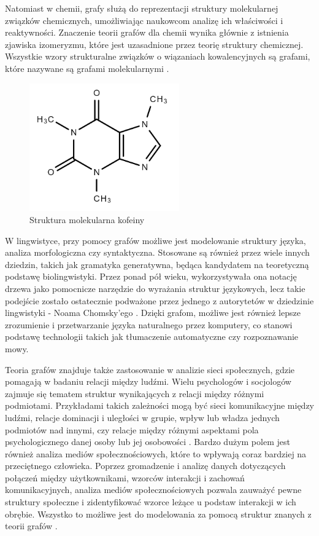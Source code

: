 Natomiast w chemii, grafy służą do reprezentacji struktury molekularnej związków chemicznych,
umożliwiając naukowcom analizę ich właściwości i reaktywności.
Znaczenie teorii grafów dla chemii wynika głównie z istnienia zjawiska izomeryzmu,
które jest uzasadnione przez teorię struktury chemicznej.
Wszystkie wzory strukturalne związków o wiązaniach kowalencyjnych są grafami,
które nazywane są grafami molekularnymi \cite{Balaban1985}.

\begin{figure}[ht]
	\centering
	\includegraphics[height=5.5cm]{partials/introduction/images/chem.png}
	\caption{Struktura molekularna kofeiny}
    \label{Fig:intro-4}
\end{figure}

W lingwistyce, przy pomocy grafów możliwe jest modelowanie struktury języka, analiza morfologiczna czy syntaktyczna.
Stosowane są również przez wiele innych dziedzin, takich jak gramatyka generatywna,
będąca kandydatem na teoretyczną podstawę biolingwistyki.
Przez ponad pół wieku, wykorzystywała ona notację drzewa jako pomocnicze narzędzie do wyrażania struktur językowych,
lecz takie podejście zostało ostatecznie podważone przez jednego z autorytetów w dziedzinie lingwistyki - Noama Chomsky'ego \cite{Arikawa2019}.
Dzięki grafom, możliwe jest również lepsze zrozumienie i przetwarzanie języka naturalnego przez komputery,
co stanowi podstawę technologii takich jak tłumaczenie automatyczne czy rozpoznawanie mowy.

Teoria grafów znajduje także zastosowanie w analizie sieci społecznych, gdzie pomagają w badaniu relacji między ludźmi.
Wielu psychologów i socjologów zajmuje się tematem struktur wynikających z relacji między różnymi podmiotami.
Przykładami takich zależności mogą być sieci komunikacyjne między ludźmi, relacje dominacji i uległości w grupie,
wpływ lub władza jednych podmiotów nad innymi, czy relacje między różnymi aspektami pola psychologicznego danej osoby lub jej osobowości \cite{Harary1953}.
Bardzo dużym polem jest również analiza mediów społecznościowych, które to wpływają coraz bardziej na przeciętnego człowieka.
Poprzez gromadzenie i analizę danych dotyczących połączeń między użytkownikami, wzorców interakcji i zachowań komunikacyjnych,
analiza mediów społecznościowych pozwala zauważyć pewne struktury społeczne i zidentyfikować wzorce leżące u podstaw interakcji w ich obrębie.
Wszystko to możliwe jest do modelowania za pomocą struktur znanych z teorii grafów \cite{Umami2024}.

